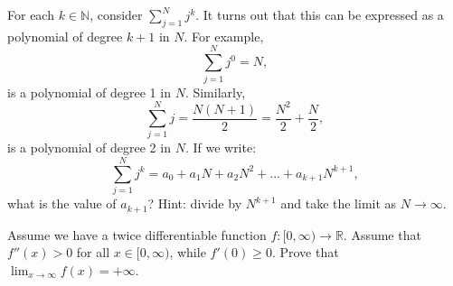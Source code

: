   \begin{exercise}
    For each $k \in \mathbb{N}$, consider $\sum_{j=1}^N j^k$. It turns out that this can be expressed as a polynomial of degree $k + 1$ in $N$. For example,
    \begin{equation}
      \sum_{j=1}^N j^0 = N,
    \end{equation}
    is a polynomial of degree 1 in $N$. Similarly,
    \begin{equation}
      \sum_{j=1}^N j = \frac{N(N + 1)}{2} = \frac{N^2}{2} + \frac{N}{2},
    \end{equation}
    is a polynomial of degree 2 in $N$. If we write:
    \begin{equation}
      \sum_{j=1}^N j^k = a_0 + a_1N + a_2N^2 + ... + a_{k+1}N^{k+1},
    \end{equation}
    what is the value of $a_{k+1}$? Hint: divide by $N^{k+1}$ and take the limit as $N \to \infty$.
  \end{exercise}
  \begin{solution}

  \end{solution}

  \begin{exercise}
    Assume we have a twice differentiable function $f : [0, \infty) \to \mathbb{R}$. Assume that $f''(x) > 0$ for all $x \in [0, \infty)$, while $f'(0) \geq 0$. Prove that $\lim_{x\to\infty} f(x) = +\infty$.
  \end{exercise}
  \begin{solution}

  \end{solution}

